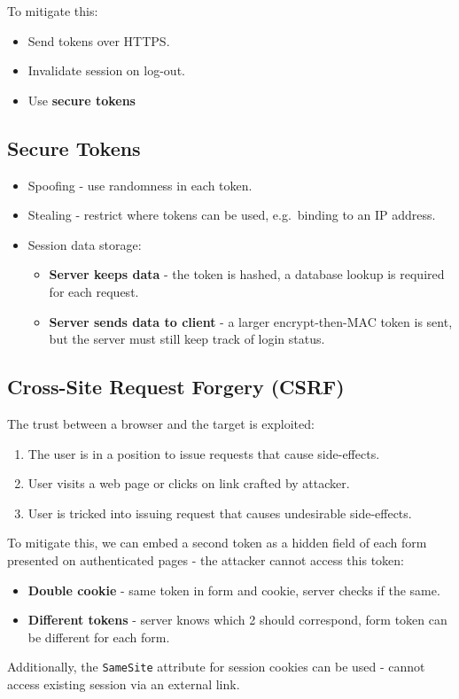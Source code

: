 \documentclass[11pt]{article}
\begin{document}
To mitigate this:
\begin{itemize}
  \item Send tokens over HTTPS.
  \item Invalidate session on log-out.
  \item Use \textbf{secure tokens}
\end{itemize}

\subsection{Secure Tokens}
\begin{itemize}
  \item Spoofing - use randomness in each token.
  \item Stealing - restrict where tokens can be used, e.g.\ binding to an IP address.
  \item Session data storage:
    \begin{itemize}
      \item \textbf{Server keeps data} - the token is hashed, a database lookup is required for each request.
      \item \textbf{Server sends data to client} - a larger encrypt-then-MAC token is sent, but the server must still keep track of login status.
    \end{itemize}
\end{itemize}

\subsection{Cross-Site Request Forgery (CSRF)}
The trust between a browser and the target is exploited:
\begin{enumerate}
  \item The user is in a position to issue requests that cause side-effects.
  \item User visits a web page or clicks on link crafted by attacker.
  \item User is tricked into issuing request that causes undesirable side-effects.
\end{enumerate}

To mitigate this, we can embed a second token as a hidden field of each form presented on authenticated pages - the attacker cannot access this token:
\begin{itemize}
  \item \textbf{Double cookie} - same token in form and cookie, server checks if the same.
  \item \textbf{Different tokens} - server knows which 2 should correspond, form token can be different for each form.
\end{itemize}
Additionally, the \texttt{SameSite} attribute for session cookies can be used - cannot access existing session via an external link.
\end{document}
